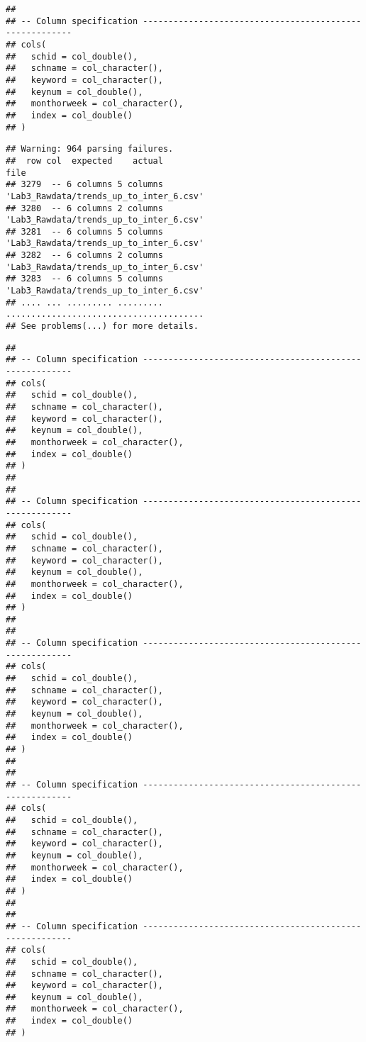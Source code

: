 \documentclass[
]{article}
\begin{document}
\begin{verbatim}
## 
## -- Column specification --------------------------------------------------------
## cols(
##   schid = col_double(),
##   schname = col_character(),
##   keyword = col_character(),
##   keynum = col_double(),
##   monthorweek = col_character(),
##   index = col_double()
## )
\end{verbatim}

\begin{verbatim}
## Warning: 964 parsing failures.
##  row col  expected    actual                                    file
## 3279  -- 6 columns 5 columns 'Lab3_Rawdata/trends_up_to_inter_6.csv'
## 3280  -- 6 columns 2 columns 'Lab3_Rawdata/trends_up_to_inter_6.csv'
## 3281  -- 6 columns 5 columns 'Lab3_Rawdata/trends_up_to_inter_6.csv'
## 3282  -- 6 columns 2 columns 'Lab3_Rawdata/trends_up_to_inter_6.csv'
## 3283  -- 6 columns 5 columns 'Lab3_Rawdata/trends_up_to_inter_6.csv'
## .... ... ......... ......... .......................................
## See problems(...) for more details.
\end{verbatim}

\begin{verbatim}
## 
## -- Column specification --------------------------------------------------------
## cols(
##   schid = col_double(),
##   schname = col_character(),
##   keyword = col_character(),
##   keynum = col_double(),
##   monthorweek = col_character(),
##   index = col_double()
## )
## 
## 
## -- Column specification --------------------------------------------------------
## cols(
##   schid = col_double(),
##   schname = col_character(),
##   keyword = col_character(),
##   keynum = col_double(),
##   monthorweek = col_character(),
##   index = col_double()
## )
## 
## 
## -- Column specification --------------------------------------------------------
## cols(
##   schid = col_double(),
##   schname = col_character(),
##   keyword = col_character(),
##   keynum = col_double(),
##   monthorweek = col_character(),
##   index = col_double()
## )
## 
## 
## -- Column specification --------------------------------------------------------
## cols(
##   schid = col_double(),
##   schname = col_character(),
##   keyword = col_character(),
##   keynum = col_double(),
##   monthorweek = col_character(),
##   index = col_double()
## )
## 
## 
## -- Column specification --------------------------------------------------------
## cols(
##   schid = col_double(),
##   schname = col_character(),
##   keyword = col_character(),
##   keynum = col_double(),
##   monthorweek = col_character(),
##   index = col_double()
## )
\end{verbatim}
\end{document}
